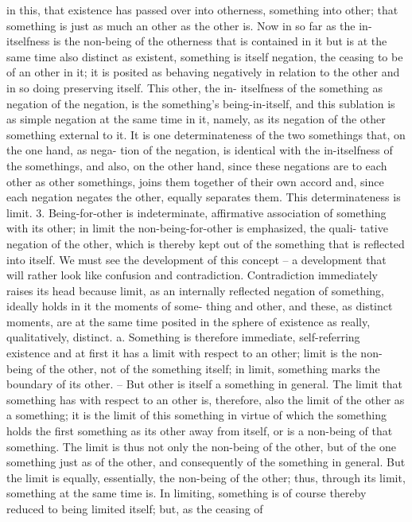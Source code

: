 in this, that existence has passed over into otherness, something into other;
that something is just as much an other as the other is. Now in so far as the
in-itselfness is the non-being of the otherness that is contained in it but
is at the same time also distinct as existent, something is itself negation,
the ceasing to be of an other in it; it is posited as behaving negatively in
relation to the other and in so doing preserving itself. This other, the in-
itselfness of the something as negation of the negation, is the something’s
being-in-itself, and this sublation is as simple negation at the same time in
it, namely, as its negation of the other something external to it. It is one
determinateness of the two somethings that, on the one hand, as nega-
tion of the negation, is identical with the in-itselfness of the somethings,
and also, on the other hand, since these negations are to each other as
other somethings, joins them together of their own accord and, since each
negation negates the other, equally separates them. This determinateness is
limit.
3. Being-for-other is indeterminate, affirmative association of something
with its other; in limit the non-being-for-other is emphasized, the quali-
tative negation of the other, which is thereby kept out of the something
that is reflected into itself. We must see the development of this concept –
a development that will rather look like confusion and contradiction.
Contradiction immediately raises its head because limit, as an internally
reflected negation of something, ideally holds in it the moments of some-
thing and other, and these, as distinct moments, are at the same time
posited in the sphere of existence as really, qualitatively, distinct.
a. Something is therefore immediate, self-referring existence and at first
it has a limit with respect to an other; limit is the non-being of the other,
not of the something itself; in limit, something marks the boundary of its
other. – But other is itself a something in general. The limit that something
has with respect to an other is, therefore, also the limit of the other as a
something; it is the limit of this something in virtue of which the something
holds the first something as its other away from itself, or is a non-being of
that something. The limit is thus not only the non-being of the other, but of
the one something just as of the other, and consequently of the something
in general.
But the limit is equally, essentially, the non-being of the other; thus,
through its limit, something at the same time is. In limiting, something
is of course thereby reduced to being limited itself; but, as the ceasing of
